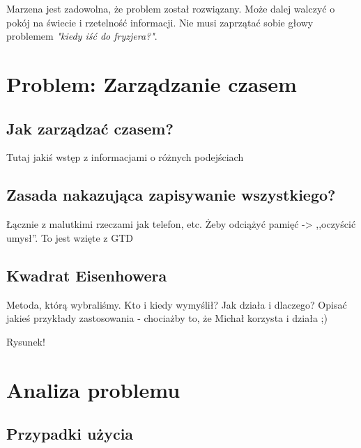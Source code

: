 \documentclass[pdflatex,11pt]{aghdpl}
\begin{document}
Marzena jest zadowolna, że problem został rozwiązany. Może dalej walczyć o pokój na świecie i rzetelność informacji. Nie musi zaprzątać sobie głowy problemem \textit{"kiedy iść do fryzjera?"}.




\chapter{Problem: Zarządzanie czasem}

\section{Jak zarządzać czasem?}

Tutaj jakiś wstęp z informacjami o różnych podejściach

\section{Zasada nakazująca zapisywanie wszystkiego?}

Łącznie z malutkimi rzeczami jak telefon, etc. Żeby odciążyć pamięć -> ,,oczyścić umysł''. To jest wzięte z GTD

\section{Kwadrat Eisenhowera}

Metoda, którą wybraliśmy. Kto i kiedy wymyślił? Jak działa i dlaczego? Opisać jakieś przykłady zastosowania - chociażby to, że Michał korzysta i działa ;)

Rysunek!



\chapter{Analiza problemu}

\section{Przypadki użycia}
\end{document}
